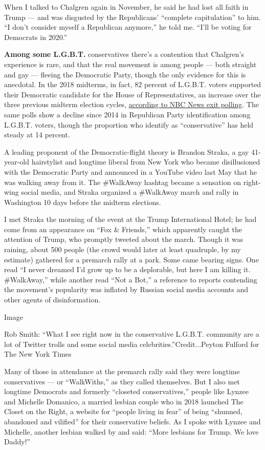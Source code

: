 When I talked to Chalgren again in November, he said he had lost all
faith in Trump --- and was disgusted by the Republicans' ``complete
capitulation'' to him. ``I don't consider myself a Republican anymore,''
he told me. ``I'll be voting for Democrats in 2020.''

\textbf{Among some L.G.B.T.} conservatives there's a contention that
Chalgren's experience is rare, and that the real movement is among
people --- both straight and gay --- fleeing the Democratic Party,
though the only evidence for this is anecdotal. In the 2018 midterms, in
fact, 82 percent of L.G.B.T. voters supported their Democratic candidate
for the House of Representatives, an increase over the three previous
midterm election cycles,
\href{https://www.nbcnews.com/feature/nbc-out/record-lgbt-support-democrats-midterms-nbc-news-exit-poll-shows-n934211}{according
to NBC News exit polling}. The same polls show a decline since 2014 in
Republican Party identification among L.G.B.T. voters, though the
proportion who identify as ``conservative'' has held steady at 14
percent.

A leading proponent of the Democratic-flight theory is Brandon Straka, a
gay 41-year-old hairstylist and longtime liberal from New York who
became disillusioned with the Democratic Party and announced in a
YouTube video last May that he was walking away from it. The \#WalkAway
hashtag became a sensation on right-wing social media, and Straka
organized a \#WalkAway march and rally in Washington 10 days before the
midterm elections.

I met Straka the morning of the event at the Trump International Hotel;
he had come from an appearance on ``Fox \& Friends,'' which apparently
caught the attention of Trump, who promptly tweeted about the march.
Though it was raining, about 500 people (the crowd would later at least
quadruple, by my estimate) gathered for a premarch rally at a park. Some
came bearing signs. One read ``I never dreamed I'd grow up to be a
deplorable, but here I am killing it. \#WalkAway,'' while another read
``Not a Bot,'' a reference to reports contending the movement's
popularity was inflated by Russian social media accounts and other
agents of disinformation.

Image

Rob Smith: ``What I see right now in the conservative L.G.B.T. community
are a lot of Twitter trolls and some social media
celebrities.''Credit...Peyton Fulford for The New York Times

Many of those in attendance at the premarch rally said they were
longtime conservatives --- or ``WalkWiths,'' as they called themselves.
But I also met longtime Democrats and formerly ``closeted
conservatives,'' people like Lynzee and Michelle Domanico, a married
lesbian couple who in 2018 launched The Closet on the Right, a website
for ``people living in fear'' of being ``shunned, abandoned and
vilified'' for their conservative beliefs. As I spoke with Lynzee and
Michelle, another lesbian walked by and said: ``More lesbians for Trump.
We love Daddy!''

